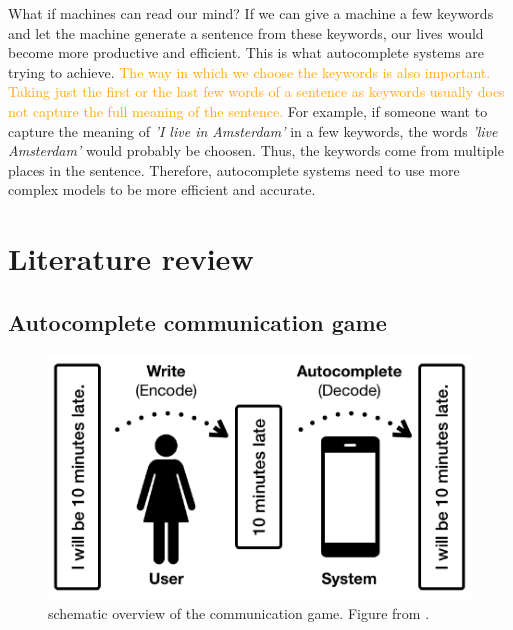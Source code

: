 
What if machines can read our mind? 
If we can give a machine a few keywords and let the machine generate a sentence from these keywords, our lives would become more productive and efficient. 
This is what autocomplete systems are trying to achieve. 
\textcolor{orange}{The way in which we choose the keywords is also important. 
Taking just the first or the last few words of a sentence as keywords usually does not capture the full meaning of the sentence.} 
For example, if someone want to capture the meaning of \textit{'I live in Amsterdam'} in a few keywords, the words \textit{'live Amsterdam'} would probably be choosen. 
Thus, the keywords come from multiple places in the sentence. 
Therefore, autocomplete systems need to use more complex models to be more efficient and accurate. 

\section{Literature review}

\subsection{Autocomplete communication game}

\begin{figure}
    \centering
    \includegraphics[width=.5\linewidth]{figs/autocomplete_game.png}
    \caption{schematic overview of the communication game. Figure from \protect{}.}
    \label{fig:autocomplete}
\end{figure}

